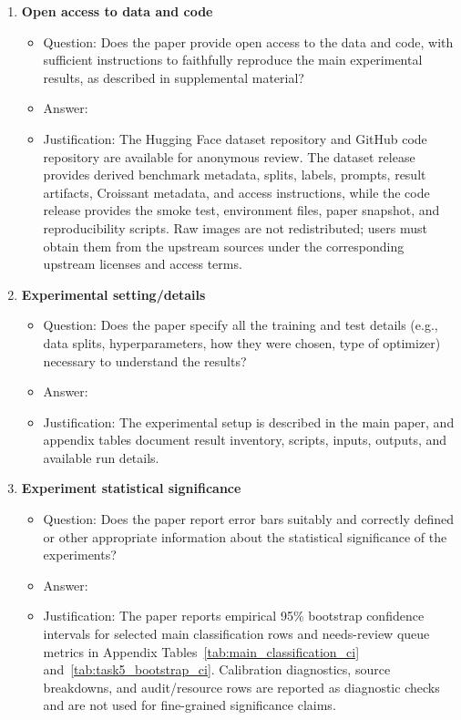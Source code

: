 \begin{enumerate}
\item {\bf Open access to data and code}
\begin{itemize}
    \item[] Question: Does the paper provide open access to the data and code, with sufficient instructions to faithfully reproduce the main experimental results, as described in supplemental material?
    \item[] Answer: \answerYes{}
    \item[] Justification: The Hugging Face dataset repository and GitHub code repository are available for anonymous review. The dataset release provides derived benchmark metadata, splits, labels, prompts, result artifacts, Croissant metadata, and access instructions, while the code release provides the smoke test, environment files, paper snapshot, and reproducibility scripts. Raw images are not redistributed; users must obtain them from the upstream sources under the corresponding upstream licenses and access terms.
\end{itemize}

\item {\bf Experimental setting/details}
\begin{itemize}
    \item[] Question: Does the paper specify all the training and test details (e.g., data splits, hyperparameters, how they were chosen, type of optimizer) necessary to understand the results?
    \item[] Answer: \answerYes{}
    \item[] Justification: The experimental setup is described in the main paper, and appendix tables document result inventory, scripts, inputs, outputs, and available run details.
\end{itemize}

\item {\bf Experiment statistical significance}
\begin{itemize}
    \item[] Question: Does the paper report error bars suitably and correctly defined or other appropriate information about the statistical significance of the experiments?
    \item[] Answer: \answerYes{}
    \item[] Justification: The paper reports empirical 95\% bootstrap confidence intervals for selected main classification rows and needs-review queue metrics in Appendix Tables~\ref{tab:main_classification_ci} and~\ref{tab:task5_bootstrap_ci}. Calibration diagnostics, source breakdowns, and audit/resource rows are reported as diagnostic checks and are not used for fine-grained significance claims.
\end{itemize}


\end{enumerate}
